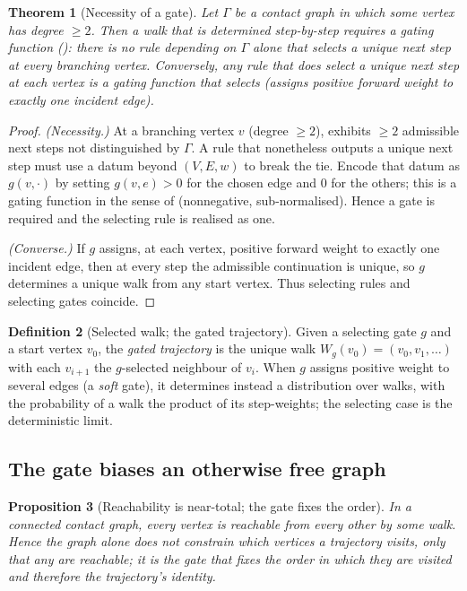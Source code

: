 \documentclass[11pt,a4paper]{article}
\theoremstyle{thmstyle}
\newtheorem{theorem}{Theorem}[section]
\newtheorem{proposition}[theorem]{Proposition}
\theoremstyle{definition}
\newtheorem{definition}[theorem]{Definition}
\theoremstyle{remark}
\newcommand{\Gph}{\Gamma}                 %
\newcommand{\V}{V}                        %
\newcommand{\E}{E}                        %
\newcommand{\wt}{w}                       %
\newcommand{\Walk}{W}                     %
\newcommand{\gate}{g}                     %
\begin{document}
\begin{theorem}[Necessity of a gate]
\label{thm:gate-necessary}
Let $\Gph$ be a contact graph in which some vertex has degree $\ge2$. Then a walk
that is determined step-by-step requires a gating function
\textup{(}\textup{)}: there is no rule depending on $\Gph$ alone
that selects a unique next step at every branching vertex. Conversely, any rule
that does select a unique next step at each vertex \emph{is} a gating function
that selects \textup{(}assigns positive forward weight to exactly one incident
edge\textup{)}.
\end{theorem}

\begin{proof}
\emph{(Necessity.)} At a branching vertex $v$ (degree $\ge2$), 
exhibits $\ge2$ admissible next steps not distinguished by $\Gph$. A rule that
nonetheless outputs a unique next step must use a datum beyond $(\V,\E,\wt)$ to
break the tie. Encode that datum as $\gate(v,\cdot)$ by setting
$\gate(v,e)>0$ for the chosen edge and $0$ for the others; this is a gating
function in the sense of  (nonnegative, sub-normalised). Hence a
gate is required and the selecting rule is realised as one.

\emph{(Converse.)} If $\gate$ assigns, at each vertex, positive forward weight to
exactly one incident edge, then at every step the admissible continuation is
unique, so $\gate$ determines a unique walk from any start vertex. Thus selecting
rules and selecting gates coincide.
\end{proof}

\begin{definition}[Selected walk; the gated trajectory]
\label{def:gated-walk}
Given a selecting gate $\gate$ and a start vertex $v_0$, the \emph{gated
trajectory} is the unique walk $\Walk_\gate(v_0)=(v_0,v_1,\dots)$ with each
$v_{i+1}$ the $\gate$-selected neighbour of $v_i$. When $\gate$ assigns positive
weight to several edges \textup{(}a \emph{soft} gate\textup{)}, it determines
instead a distribution over walks, with the probability of a walk the product of
its step-weights; the selecting case is the deterministic limit.
\end{definition}

\subsection{The gate biases an otherwise free graph}

\begin{proposition}[Reachability is near-total; the gate fixes the order]
\label{prop:reachability}
In a connected contact graph, every vertex is reachable from every other by some
walk. Hence the graph alone does not constrain \emph{which} vertices a trajectory
visits, only that any are reachable; it is the gate that fixes the \emph{order}
in which they are visited and therefore the trajectory's identity.
\end{proposition}
\end{document}
